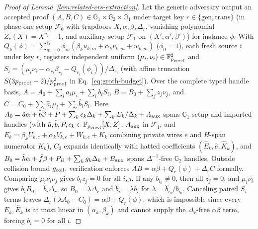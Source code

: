 \documentclass[conference,compsoc]{IEEEtran}
\theoremstyle{definition}
\numberwithin{equation}{section}
\numberwithin{table}{section}
\numberwithin{figure}{section}
\theoremstyle{plain}
\begin{document}
\begin{proof}[Proof of Lemma~\ref{lem:related-crs-extraction}]
Let the generic adversary output an accepted proof \((A, B, C)\in\mathbb G_1\times\mathbb G_2\times\mathbb G_1\) under target key \(r\in\{\mathrm{gen},\mathrm{trans}\}\) (in phase-one setup \(\mathcal F_0\) with trapdoors \(X,\alpha,\beta,\Delta_r\), vanishing polynomial \(Z_r(X)=X^{n_r}-1\), and auxiliary setup \(\mathcal F_1\) on \((X',\alpha',\beta')\)) for instance \(\phi\). With \(Q_k(\phi)=\sum_{m=0}^{\ell_k}\phi_m(\beta_k u_{k,m}+\alpha_k v_{k,m}+w_{k,m})\) (\(\phi_0=1\)), each fresh source \(i\) under key \(r_i\) registers independent uniform \((\mu_i,\nu_i)\in\mathbb F_{p_{\rm proof}}^2\) and \(S_i=(\mu_i\nu_i-\alpha_{r_i}\beta_{r_i}-Q_{r_i}(\phi_i))/\Delta_{r_i}\) (with affine truncation \(S(3p_{\rm proof}-2)/p_{\rm proof}^2\) in Eq.~\eqref{eq:groth-budget}). Over the complete typed handle basis, \(A = A_0 + \sum_i a_i \mu_i + \sum_i b_i S_i\), \(B = B_0 + \sum_j z_j \nu_j\), and \(C = C_0 + \sum_i \hat a_i \mu_i + \sum_i \hat b_i S_i\). Here \(A_0=\tilde a\alpha+\tilde b\beta+P+\sum_k c_k\Delta_k+\sum_k E_k/\Delta_k+A_{\rm aux}\) spans \(\mathbb G_1\) setup and imported handles (with \(\tilde a,\tilde b,P,c_k\in\mathbb F_{p_{\rm proof}}[X,Z]\), \(A_{\rm aux}\) in \(\mathcal F_1\), and \(E_k=\beta_k U_{k,e}+\alpha_k V_{k,e}+W_{k,e}+K_k\) combining private wires \(e\) and \(H\)-span numerator \(K_k\)), \(C_0\) expands identically with hatted coefficients \((\hat E_k,\hat e,\hat K_k)\), and \(B_0=\tilde h\alpha+\tilde f\beta+P_B+\sum_k g_k\Delta_k+B_{\rm aux}\) spans \(\Delta^{-1}\)-free \(\mathbb G_2\) handles. Outside collision bound \(g_{\rm coll}\), verification enforces \(A B = \alpha\beta + Q_r(\phi) + \Delta_r C\) formally. Comparing \(\mu_i\nu_i\nu_j\) gives \(b_i z_j = 0\) for all \(i,j\). If any \(b_{i_0}\neq 0\), then all \(z_j=0\), and \(\mu_i\nu_i\) gives \(b_i B_0 = \hat b_i \Delta_r\), so \(B_0 = \lambda\Delta_r\) and \(\hat b_i = \lambda b_i\) for \(\lambda=\hat b_{i_0}/b_{i_0}\). Canceling paired \(S_i\) terms leaves \(\Delta_r(\lambda A_0 - C_0) = \alpha\beta + Q_r(\phi)\), which is impossible since every \(E_k,\hat E_k\) is at most linear in \((\alpha_k,\beta_k)\) and cannot supply the \(\Delta_r\)-free \(\alpha\beta\) term, forcing \(b_i = 0\) for all \(i\).


\end{proof}
\end{document}
